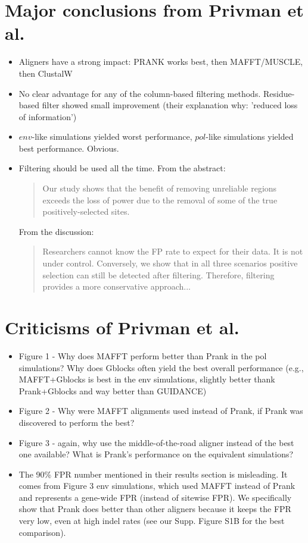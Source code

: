 \documentclass{article}
\begin{document}
\section{Major conclusions from Privman et al.}
\begin{itemize}

\item{Aligners have a strong impact: PRANK works best, then MAFFT/MUSCLE, then ClustalW}
\item{No clear advantage for any of the column-based filtering methods. Residue-based filter showed small improvement (their explanation why: 'reduced loss of information')}
\item{$env$-like simulations yielded worst performance, $pol$-like simulations yielded best performance. Obvious.}
\item{Filtering should be used all the time. From the abstract:
\begin{quote}
Our study shows that the benefit of removing unreliable regions exceeds the loss of power due to the removal of some of the true positively-selected sites.
\end{quote}

From the discussion:

\begin{quote}
Researchers cannot know the FP rate to expect for their data. It is not under control. Conversely, we show that in all three scenarios positive selection can still be detected after filtering. Therefore, filtering provides a more conservative approach...
\end{quote}

}

\end{itemize}

\section{Criticisms of Privman et al.}

\begin{itemize}

\item{Figure 1 - Why does MAFFT perform better than Prank in the pol simulations? Why does Gblocks often yield the best overall performance (e.g., MAFFT+Gblocks is best in the env simulations, slightly better thank Prank+Gblocks and way better than GUIDANCE)}
\item{Figure 2 - Why were MAFFT alignments used instead of Prank, if Prank was discovered to perform the best?}
\item{Figure 3 - again, why use the middle-of-the-road aligner instead of the best one available? What is Prank's performance on the equivalent simulations?}
\item{The 90\% FPR number mentioned in their results section is misleading. It comes from Figure 3 env simulations, which used MAFFT instead of Prank and represents a gene-wide FPR (instead of sitewise FPR). We specifically show that Prank does better than other aligners because it keeps the FPR very low, even at high indel rates (see our Supp. Figure S1B for the best comparison).}

\end{itemize}
\end{document}
